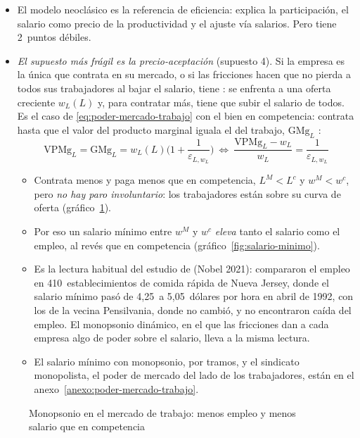 \documentclass[11pt]{article}
\begin{document}
\begin{itemize}
\item El modelo neoclásico es la referencia de eficiencia: explica la participación, el salario como precio de la productividad y el ajuste vía salarios. Pero tiene 2~puntos débiles.
\item \emph{El supuesto más frágil es la precio-aceptación} (supuesto 4). Si la empresa es la única que contrata en su mercado, o si las fricciones hacen que no pierda a todos sus trabajadores al bajar el salario, tiene : se enfrenta a una oferta creciente $w_L(L)$ y, para contratar más, tiene que subir el salario de todos. Es el caso de \eqref{eq:poder-mercado-trabajo} con el bien en competencia: contrata hasta que el valor del producto marginal iguala el  del trabajo, $\mathrm{GMg}_L$ :
  \begin{equation}
  \mathrm{VPMg}_L=\mathrm{GMg}_L=w_L(L)\Big(1+\frac{1}{\varepsilon_{L,w_L}}\Big)\ \Longleftrightarrow\ \frac{\mathrm{VPMg}_L-w_L}{w_L}=\frac{1}{\varepsilon_{L,w_L}}\label{eq:monopsonio}
  \end{equation}
  \begin{itemize}
  \item Contrata menos y paga menos que en competencia, $L^M<L^c$ y $w^M<w^c$, pero \emph{no hay paro involuntario}: los trabajadores están sobre su curva de oferta (gráfico~\ref{fig:monopsonio}).
  \item Por eso un salario mínimo entre $w^M$ y $w^c$ \emph{eleva} tanto el salario como el empleo, al revés que en competencia (gráfico~\ref{fig:salario-minimo}).
  \item Es la lectura habitual del estudio de \textcite{CardKrueger1994} (Nobel 2021): compararon el empleo en 410~establecimientos de comida rápida de Nueva Jersey, donde el salario mínimo pasó de 4{,}25~a 5{,}05~dólares por hora en abril de 1992, con los de la vecina Pensilvania, donde no cambió, y no encontraron caída del empleo. El monopsonio dinámico, en el que las fricciones dan a cada empresa algo de poder sobre el salario, lleva a la misma lectura\nocite{Manning2003Monopsony}.
  \item El salario mínimo con monopsonio, por tramos, y el sindicato monopolista, el poder de mercado del lado de los trabajadores, están en el anexo~\ref{anexo:poder-mercado-trabajo}.
  \end{itemize}
\end{itemize}

\begin{figure}[H]
\centering
\caption{Monopsonio en el mercado de trabajo: menos empleo y menos salario que en competencia}\label{fig:monopsonio}
\end{figure}
\end{document}

